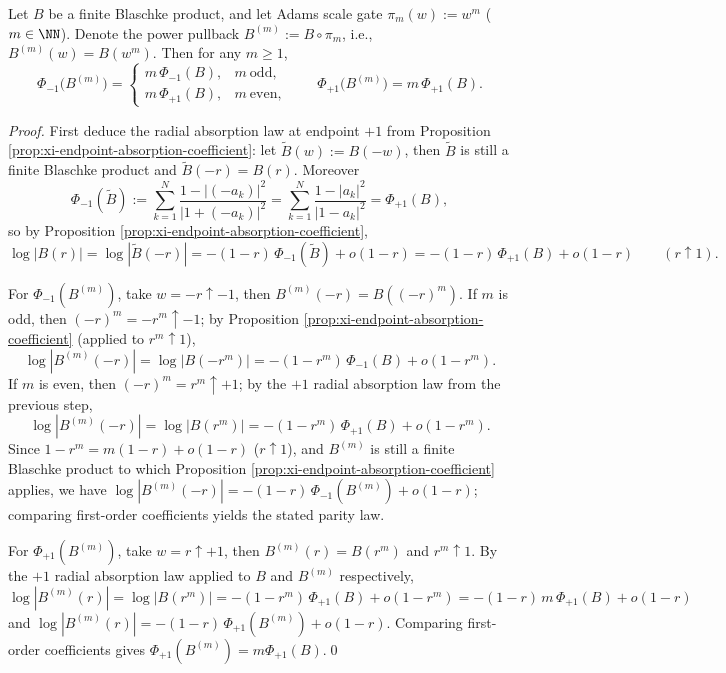 \begin{theorem}\label{thm:xi-endpoint-absorption-adams-rescaling}
Let \(B\) be a finite Blaschke product, and let Adams scale gate \(\pi_m(w):=w^m\) (\(m\in\NN\)).
Denote the power pullback \(B^{(m)}:=B\circ\pi_m\), i.e., \(B^{(m)}(w)=B(w^m)\).
Then for any \(m\ge 1\),
\[
\boxed{\;
\Phi_{-1}\bigl(B^{(m)}\bigr)=
\begin{cases}
m\,\Phi_{-1}(B),& m\ \text{odd},\\[2pt]
m\,\Phi_{+1}(B),& m\ \text{even},
\end{cases}
\qquad
\Phi_{+1}\bigl(B^{(m)}\bigr)=m\,\Phi_{+1}(B).\;}
\]
\end{theorem}

\begin{proof}
First deduce the radial absorption law at endpoint \(+1\) from Proposition \ref{prop:xi-endpoint-absorption-coefficient}: let \(\widetilde B(w):=B(-w)\), then \(\widetilde B\) is still a finite Blaschke product and \(\widetilde B(-r)=B(r)\).
Moreover
\[
\Phi_{-1}(\widetilde B)
:=\sum_{k=1}^{N}\frac{1-|(-a_k)|^2}{|1+(-a_k)|^2}
=\sum_{k=1}^{N}\frac{1-|a_k|^2}{|1-a_k|^2}
=\Phi_{+1}(B),
\]
so by Proposition \ref{prop:xi-endpoint-absorption-coefficient},
\[
\log|B(r)|
=\log|\widetilde B(-r)|
=-(1-r)\,\Phi_{-1}(\widetilde B)+o(1-r)
=-(1-r)\,\Phi_{+1}(B)+o(1-r)
\qquad(r\uparrow 1).
\]
\par
For \(\Phi_{-1}(B^{(m)})\), take \(w=-r\uparrow-1\), then
\(
B^{(m)}(-r)=B((-r)^m)
\).
If \(m\) is odd, then \((-r)^m=-r^m\uparrow-1\); by Proposition \ref{prop:xi-endpoint-absorption-coefficient} (applied to \(r^m\uparrow 1\)),
\[
\log|B^{(m)}(-r)|=\log|B(-r^m)|=-(1-r^m)\,\Phi_{-1}(B)+o(1-r^m).
\]
If \(m\) is even, then \((-r)^m=r^m\uparrow+1\); by the \(+1\) radial absorption law from the previous step,
\[
\log|B^{(m)}(-r)|=\log|B(r^m)|=-(1-r^m)\,\Phi_{+1}(B)+o(1-r^m).
\]
Since \(1-r^m=m(1-r)+o(1-r)\) (\(r\uparrow 1\)), and \(B^{(m)}\) is still a finite Blaschke product to which Proposition \ref{prop:xi-endpoint-absorption-coefficient} applies, we have
\(
\log|B^{(m)}(-r)|=-(1-r)\,\Phi_{-1}(B^{(m)})+o(1-r)
\);
comparing first-order coefficients yields the stated parity law.
\par
For \(\Phi_{+1}(B^{(m)})\), take \(w=r\uparrow+1\), then \(B^{(m)}(r)=B(r^m)\) and \(r^m\uparrow 1\).
By the \(+1\) radial absorption law applied to \(B\) and \(B^{(m)}\) respectively,
\[
\log|B^{(m)}(r)|
=\log|B(r^m)|
=-(1-r^m)\,\Phi_{+1}(B)+o(1-r^m)
=-(1-r)\,m\,\Phi_{+1}(B)+o(1-r)
\]
and
\(
\log|B^{(m)}(r)|=-(1-r)\,\Phi_{+1}(B^{(m)})+o(1-r)
\).
Comparing first-order coefficients gives \(\Phi_{+1}(B^{(m)})=m\Phi_{+1}(B)\).\qed
\end{proof}

